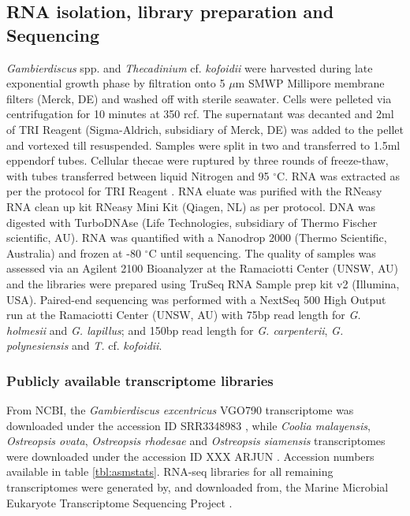 \documentclass[fleqn,10pt,lineno]{wlpeerj} %
\begin{document}
\subsection*{RNA isolation, library preparation and Sequencing}
\emph{Gambierdiscus} spp. and \emph{Thecadinium} cf. \emph{kofoidii} were harvested during late exponential growth phase by filtration onto 5 $\mu$m SMWP Millipore membrane filters (Merck, DE) and washed off with sterile seawater. %
Cells were pelleted via centrifugation for 10 minutes at 350 rcf. 
The supernatant was decanted and 2ml of TRI Reagent (Sigma-Aldrich, subsidiary of Merck, DE) was added to the pellet and vortexed till resuspended. %
Samples were split in two and transferred to 1.5ml eppendorf tubes. 
Cellular thecae were ruptured by three rounds of freeze-thaw, with tubes transferred between liquid Nitrogen and 95 $^{\circ}$C. %
RNA was extracted as per the protocol for TRI Reagent \cite{rio2010purification}.
RNA eluate was purified with the RNeasy RNA clean up kit RNeasy Mini Kit (Qiagen, NL) as per protocol. 
DNA was digested with TurboDNAse (Life Technologies, subsidiary of Thermo Fischer scientific, AU). 
RNA was quantified with a Nanodrop 2000 (Thermo Scientific, Australia) and frozen at -80 $^{\circ}$C until sequencing.
The quality of samples was assessed via an Agilent 2100 Bioanalyzer at the Ramaciotti Center (UNSW, AU) and the libraries were prepared using TruSeq RNA Sample prep kit v2 (Illumina, USA). 
Paired-end sequencing was performed with a NextSeq 500 High Output run at the Ramaciotti Center (UNSW, AU) with 75bp read length for \emph{G. holmesii} and \emph{G. lapillus}; and 150bp read length for \emph{G. carpenterii}, \emph{G. polynesiensis} and \emph{T.} cf. \emph{kofoidii}.

\subsubsection*{Publicly available transcriptome libraries}
From NCBI, the \emph{Gambierdiscus excentricus} VGO790 transcriptome was downloaded under the accession ID SRR3348983 \cite{kohli2017role}, while \textit{Coolia malayensis}, \textit{Ostreopsis ovata}, \textit{Ostreopsis rhodesae} and \textit{Ostreopsis siamensis} transcriptomes were downloaded under the accession ID XXX ARJUN \cite{verma2018comparative}. 
Accession numbers available in table \ref{tbl:asmstats}. 
RNA-seq libraries for all remaining transcriptomes were generated by, and downloaded from, the Marine Microbial Eukaryote Transcriptome Sequencing Project \citep{keeling2014marine}.
\end{document}
